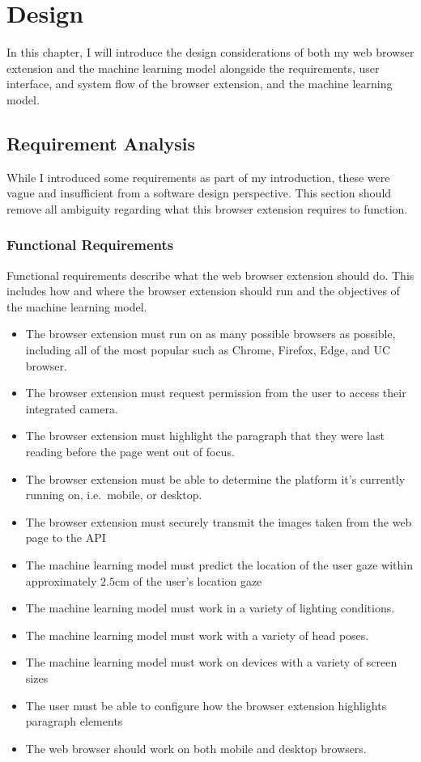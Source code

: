 \documentclass{report}
\begin{document}
\chapter{Design}
\label{chap:design}

In this chapter, I will introduce the design considerations of both my web browser extension and the machine learning model alongside the requirements, user interface, and system flow of the browser extension, and the machine learning model. 

\section{Requirement Analysis}\label{sec:requirement-analysis}

While I introduced some requirements as part of my introduction, these were vague and insufficient from a software design perspective. This section should remove all ambiguity regarding what this browser extension requires to function.  


\subsection{Functional Requirements}

Functional requirements describe what the web browser extension should do. This includes how and where the browser extension should run and the objectives of the machine learning model.

\begin{itemize}
    \item The browser extension must run on as many possible browsers as possible, including all of the most popular such as Chrome, Firefox, Edge, and UC browser. 
    \item The browser extension must request permission from the user to access their integrated camera.
    \item The browser extension must highlight the paragraph that they were last reading before the page went out of focus. 
    \item The browser extension must be able to determine the platform it's currently running on, i.e.~mobile, or desktop. 
    \item The browser extension must securely transmit the images taken from the web page to the API 
    \item The machine learning model must predict the location of the user gaze within approximately \(2.5\text{cm}\) of the user's location gaze 
    \item The machine learning model must work in a variety of lighting conditions.
    \item The machine learning model must work with a variety of head poses. 
    \item The machine learning model must work on devices with a variety of screen sizes 
    \item The user must be able to configure how the browser extension highlights paragraph elements 
    \item The web browser should work on both mobile and desktop browsers. 
\end{itemize}
\end{document}
